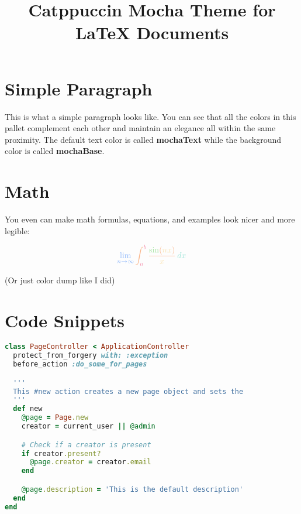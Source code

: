 \documentclass[12pt]{article}
\title{ \Huge \textbf{\textcolor{mochaPink}{Catppuccin Mocha Theme for} \textcolor{mochaLavender}{\LaTeX{} Documents}} \vspace{-3em}}
\date{}
\begin{document}
\maketitle

\section{\textcolor{mochaSky}{Simple Paragraph}}
\textcolor{mochaYellow}{This is what a simple paragraph looks like.} You can see that all the colors in this pallet complement each other and maintain an elegance all within the same proximity. The default text color is called \textbf{\textcolor{mochaGreen}{mochaText}} while the background color is called \textbf{\textcolor{mochaGreen}{mochaBase}}.

\section{\textcolor{mochaSky}{Math}}

You even can make math formulas, equations, and examples look nicer and more legible:


\[\large{
    \textcolor{mochaBlue}{\lim_{{n \to \infty}} \textcolor{mochaPeach}{\int_{\textcolor{mochaRed}{a}}^{\textcolor{mochaRed}{b}} \frac{\textcolor{mochaGreen}{\sin}(\textcolor{mochaYellow}{nx})}{\textcolor{mochaYellow}{x}} \, \textcolor{mochaTeal}{dx}}}
}\]

\tiny{(Or just color dump like I did)}

\section{\textcolor{mochaSky}{Code Snippets}}

\begin{lstlisting}[language=Ruby,style=ruby_on_rails, caption={A ruby on rails code sample}]
class PageController < ApplicationController
  protect_from_forgery with: :exception
  before_action :do_some_for_pages

  '''
  This #new action creates a new page object and sets the
  '''
  def new
    @page = Page.new
    creator = current_user || @admin

    # Check if a creator is present
    if creator.present?
      @page.creator = creator.email
    end

    @page.description = 'This is the default description'
  end
end
\end{lstlisting}
\end{document}
